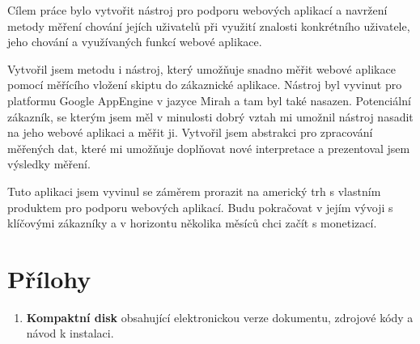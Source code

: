 \documentclass[bc,male,java,dept456]{diploma}						%
\begin{document}

Cílem práce bylo vytvořit nástroj pro podporu webových aplikací a navržení metody měření chování jejích uživatelů při využití znalosti konkrétního uživatele, jeho chování a využívaných funkcí webové aplikace.


Vytvořil jsem metodu i nástroj, který umožňuje snadno měřit webové aplikace pomocí měřícího vložení skiptu do zákaznické aplikace. Nástroj byl vyvinut pro platformu Google AppEngine v jazyce Mirah a tam byl také nasazen.  Potenciální zákazník, se kterým jsem měl v minulosti dobrý vztah mi umožnil nástroj nasadit na jeho webové aplikaci a měřit ji. Vytvořil jsem abstrakci pro zpracování měřených dat, které mi umožňuje do\-pl\-ňo\-vat nové interpretace a prezentoval jsem výsledky měření.


Tuto aplikaci jsem vyvinul se záměrem prorazit na americký trh s vlastním produktem pro podporu webových aplikací. Budu pokračovat v jejím vývoji s klíčovými zá\-ka\-zní\-ky a v horizontu několika měsíců chci začít s monetizací.

\section{Přílohy}

\begin{enumerate}
\item \textbf{Kompaktní disk} obsahující elektronickou verze dokumentu, zdrojové kódy a návod k instalaci.
\end{enumerate}
\end{document}
